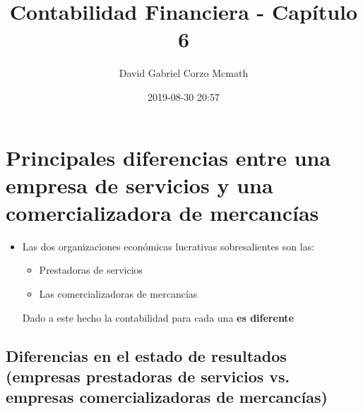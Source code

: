 \documentclass{article}
\author{David Gabriel Corzo Mcmath}
\title{Contabilidad Financiera - Capítulo 6}
\date{2019-08-30 20:57}
\begin{document}
\maketitle

\section{Principales diferencias entre una empresa de servicios y una comercializadora de mercancías}
\begin{itemize}
    \item Las dos organizaciones económicas lucrativas sobresalientes son las:
    \begin{itemize}
        \item Prestadoras de servicios
        \item Las comercializadoras de mercancías 
    \end{itemize}
    Dado a este hecho la contabilidad para cada una \textbf{es diferente}
\end{itemize}




\subsection{Diferencias en el estado de resultados (empresas prestadoras de servicios vs. empresas comercializadoras de mercancías)}
\end{document}
